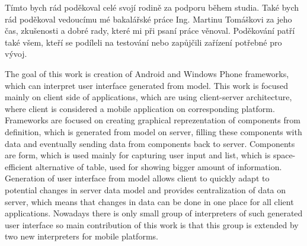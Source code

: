\documentclass[11pt,twoside,a4paper]{book}
\begin{document}
	\coverpagestarts


	\acknowledgements
	\noindent
	Tímto bych rád poděkoval celé svojí rodině za podporu během studia. Také bych rád poděkoval vedoucímu mé bakalářské práce Ing. Martinu Tomáškovi za jeho čas, zkušenosti a dobré rady, které mi při psaní práce věnoval. Poděkování patří také všem, kteří se podíleli na testování nebo zapůjčili zařízení potřebné pro vývoj.





 
	\abstractpage

	The goal of this work is creation of Android and Windows Phone frameworks, which can interpret user interface generated from model. This work is focused mainly on client side of applications, which are using client-server architecture, where client is considered a mobile application on corresponding platform. Frameworks are focused on creating graphical reprezentation of components from definition, which is generated from model on server, filling these components with data and eventually sending data from components back to server. Components are form, which is used mainly for capturing user input and list, which is space-efficient alternative of table, used for showing bigger amount of information. Generation of user interface from model allows client to quickly adapt to potential changes in server data model and provides centralization of data on server, which means that changes in data can be done in one place for all client applications. Nowadays there is only small group of interpreters of such generated user interface so main contribution of this work is that this group is extended by two new interpreters for mobile platforms.


	\baselineskip
\end{document}
